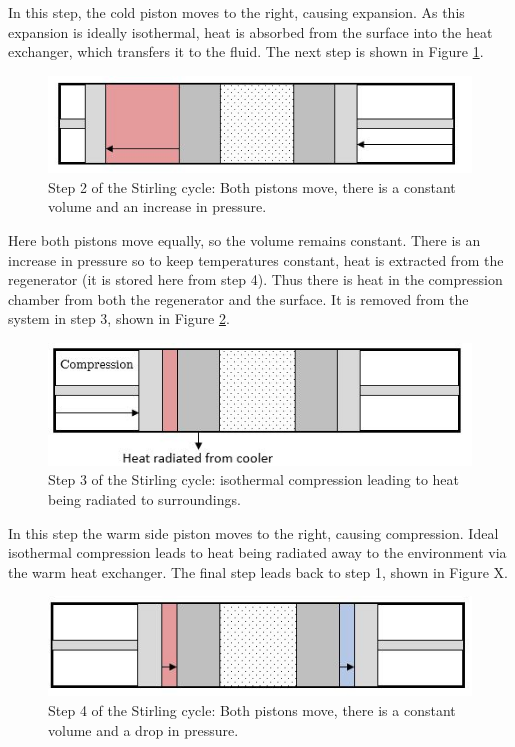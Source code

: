 In this step, the cold piston moves to the right, causing expansion. As this expansion is ideally isothermal, heat is absorbed from the surface into the heat exchanger, which transfers it to the fluid. The next step is shown in Figure \ref{fig:stirling_cycle_part_2}.

\begin{figure}[h]
\centering
  \includegraphics[width=0.8\linewidth]{chap2_images/stirling_process_cold_transfer.JPG}
  \caption{Step 2 of the Stirling cycle: Both pistons move, there is a constant volume and an increase in pressure.}
  \label{fig:stirling_cycle_part_2}
\end{figure}

Here both pistons move equally, so the volume remains constant. There is an increase in pressure so to keep temperatures constant, heat is extracted from the regenerator (it is stored here from step 4). Thus there is heat in the compression chamber from both the regenerator and the surface. It is removed from the system in step 3, shown in Figure \ref{fig:stirling_cycle_part_3}.

\begin{figure}[h]
\centering
  \includegraphics[width=0.8\linewidth]{chap2_images/stirling_process_heat_radiation.JPG}
  \caption{Step 3 of the Stirling cycle: isothermal compression leading to heat being radiated to surroundings.}
  \label{fig:stirling_cycle_part_3}
\end{figure}

In this step the warm side piston moves to the right, causing compression. Ideal isothermal compression leads to heat being radiated away to the environment via the warm heat exchanger. The final step leads back to step 1, shown in Figure X.

\begin{figure}[h]
\centering
  \includegraphics[width=0.8\linewidth]{chap2_images/stirling_process_heat_transfer.JPG}
  \caption{Step 4 of the Stirling cycle: Both pistons move, there is a constant volume and a drop in pressure.}
  \label{fig:stirling_cycle_part_4}
\end{figure}

